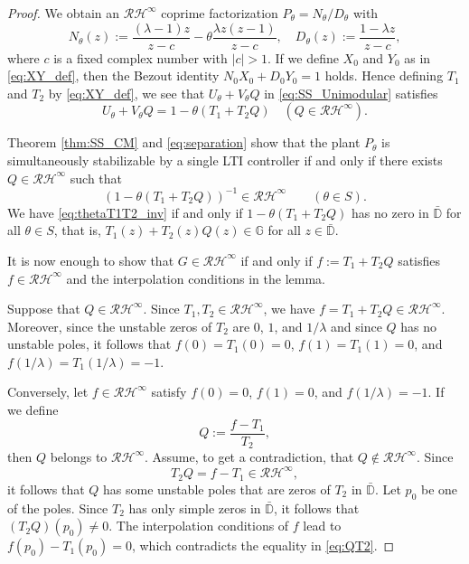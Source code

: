 \documentclass[letterpaper, 12pt, draftcls, onecolumn]{ieeeconf}
\begin{document}
\begin{proof}
We obtain an $\mathcal{RH}^{\infty}$ coprime factorization 
$P_{\theta} = N_{\theta}/D_{\theta}$ with
\begin{equation}
\label{eq:NDdef}
N_{\theta}(z) := \frac{(\lambda-1)z}{z-c} - \theta \frac{\lambda z(z-1)}{z-c},
\quad
D_{\theta}(z) := \frac{1-\lambda z}{z-c},
\end{equation}
where $c$ is a fixed complex number with $|c| > 1$. 
If we define $X_0$ and $Y_0$ as in \eqref{eq:XY_def},
then the Bezout identity $N_0X_0 + D_0 Y_0 = 1$ holds.
Hence defining $T_1$ and $T_2$ by \eqref{eq:XY_def},
we see that
$U_{\theta} + V_{\theta}Q$ in \eqref{eq:SS_Unimodular} satisfies
\begin{equation}
\label{eq:separation}
U_{\theta} + V_{\theta}Q
=
1 - \theta 
\left(
T_1
+
T_2Q
\right)
\quad (Q \in \mathcal{RH}^{\infty}).
\end{equation}

Theorem \ref{thm:SS_CM} and \eqref{eq:separation} show that
the plant $P_{\theta}$
is simultaneously stabilizable by a single LTI controller
if and only if there exists $Q \in \mathcal{RH}^{\infty}$ such that
\begin{equation}
\label{eq:thetaT1T2_inv}
(1 - \theta (T_1 + T_2Q))^{-1} \in \mathcal{RH}^{\infty}\qquad
(\theta \in S).
\end{equation}
We have \eqref{eq:thetaT1T2_inv} if and only if 
$1 - \theta (T_1 + T_2Q)$ has no zero in $\bar{\mathbb{D}}$ 
for all $\theta \in S$, that is,
$
T_1(z) + T_2(z)Q(z) \in \mathbb{G}
$
for all $z \in \bar{\mathbb{D}}$.

It is now enough to show that
$G \in \mathcal{RH}^{\infty}$ if and only if
$f := T_1 +T_2Q$ satisfies $f \in \mathcal{RH}^{\infty}$ 
and the interpolation conditions in the lemma.

Suppose that $Q\in \mathcal{RH}^{\infty}$. Since
$T_1, T_2 \in \mathcal{RH}^{\infty}$, we have
$
f = T_1 + T_2Q \in \mathcal{RH}^{\infty}.
$
Moreover,
since the unstable zeros of $T_2$ are $0$, $1$, and $1/\lambda$
and since $Q$ has no unstable poles,
it follows that $f(0) = T_1(0) = 0$, $f(1) = T_1(1) = 0$, and
$f(1/\lambda) = T_1(1/\lambda) = -1$.

Conversely, let $f\in \mathcal{RH}^{\infty}$ satisfy 
$f(0) = 0$, $f(1) = 0$, and $f(1/\lambda) = -1$.
If we define 
\begin{equation}
\label{eq:U_0andF0}
Q := \frac{f- T_1}{T_2},
\end{equation}
then $Q$ belongs to $\mathcal{RH}^{\infty}$.
Assume, to get a contradiction, 
that $Q \not\in \mathcal{RH}^{\infty}$. Since
\begin{equation}
\label{eq:QT2}
T_2Q = f - T_1\in \mathcal{RH}^{\infty},
\end{equation} 
it follows that
$Q$ has some
unstable poles that are zeros of $T_2$ in $\bar{\mathbb{D}}$. 
Let $p_0$ be one of the poles.
Since $T_2$ has only simple zeros in $\bar{\mathbb{D}}$, it follows that
$(T_2Q)(p_0) \not= 0$. The interpolation conditions of $f$ lead to
$f(p_0) - T_1(p_0) = 0$, which contradicts the equality in \eqref{eq:QT2}.
\end{proof}
\end{document}
